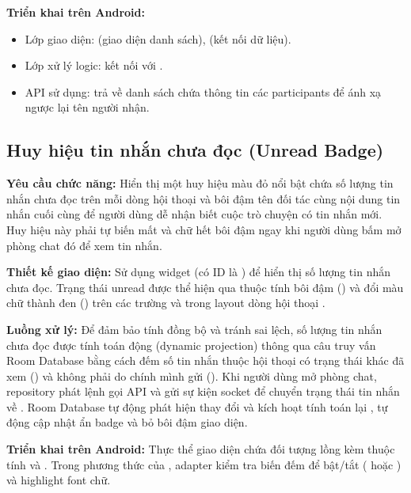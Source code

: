 \textbf{Triển khai trên Android:}
\begin{itemize}
    \item Lớp giao diện:  (giao diện danh sách),  (kết nối dữ liệu).
    \item Lớp xử lý logic:  kết nối với .
    \item API sử dụng:  trả về danh sách  chứa thông tin các participants để ánh xạ ngược lại tên người nhận.
\end{itemize}

\subsection{Huy hiệu tin nhắn chưa đọc (Unread Badge)}
\textbf{Yêu cầu chức năng:} Hiển thị một huy hiệu màu đỏ nổi bật chứa số lượng tin nhắn chưa đọc trên mỗi dòng hội thoại và bôi đậm tên đối tác cùng nội dung tin nhắn cuối cùng để người dùng dễ nhận biết cuộc trò chuyện có tin nhắn mới. Huy hiệu này phải tự biến mất và chữ hết bôi đậm ngay khi người dùng bấm mở phòng chat đó để xem tin nhắn.

\textbf{Thiết kế giao diện:} Sử dụng widget  (có ID là ) để hiển thị số lượng tin nhắn chưa đọc. Trạng thái unread được thể hiện qua thuộc tính bôi đậm () và đổi màu chữ thành đen () trên các trường  và  trong layout dòng hội thoại .

\textbf{Luồng xử lý:} Để đảm bảo tính đồng bộ và tránh sai lệch, số lượng tin nhắn chưa đọc được tính toán động (dynamic projection) thông qua câu truy vấn Room Database bằng cách đếm số tin nhắn thuộc hội thoại có trạng thái khác đã xem () và không phải do chính mình gửi (). Khi người dùng mở phòng chat, repository phát lệnh gọi API  và gửi sự kiện socket  để chuyển trạng thái tin nhắn về . Room Database tự động phát hiện thay đổi và kích hoạt tính toán lại , tự động cập nhật ẩn badge và bỏ bôi đậm giao diện.

\textbf{Triển khai trên Android:} Thực thể giao diện  chứa đối tượng  lồng kèm thuộc tính  và . Trong phương thức  của , adapter kiểm tra biến đếm  để bật/tắt  ( hoặc ) và highlight font chữ.

